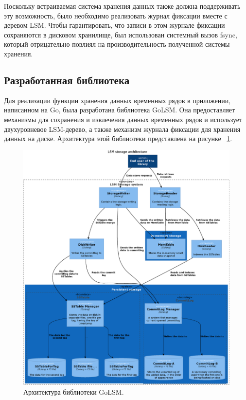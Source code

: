 Поскольку встраиваемая система хранения данных также должна поддерживать эту возможность, было необходимо реализовать журнал фиксации вместе с деревом LSM. Чтобы гарантировать, что записи в этом журнале фиксации сохраняются в дисковом хранилище, был использован системный вызов fsync, который отрицательно повлиял на производительность полученной системы хранения.

\subsection{Разработанная библиотека}
Для реализации функции хранения данных временных рядов в приложении, написанном на Go, была разработана библиотека GoLSM. Она предоставляет механизмы для сохранения и извлечения данных временных рядов и использует двухуровневое LSM-дерево, а также механизм журнала фиксации для хранения данных на диске. Архитектура этой библиотеки представлена на рисунке ~\ref{fig2}.
\begin{figure}[h!]
\includegraphics[width=\textwidth,keepaspectratio]{figures/golsm-arch.eps}
\caption{Архитектура библиотеки GoLSM.} \label{fig2}
\end{figure}

